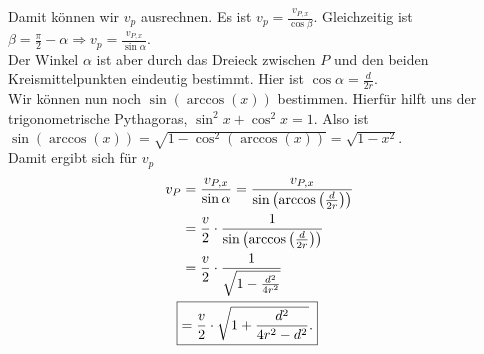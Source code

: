 \begin{Answer}[ref = circlemove]
	Damit können wir $v_p$ ausrechnen. Es ist $v_p = \frac{v_{P,x}}{\cos \beta}$. Gleichzeitig ist $\beta = \frac{\pi}{2}-\alpha \Rightarrow v_p = \frac{v_{P,x}}{\sin{\alpha}}$.\\
	Der Winkel $\alpha$ ist aber durch das Dreieck zwischen $P$ und den beiden Kreismittelpunkten eindeutig bestimmt. Hier ist $\cos \alpha = \frac{d}{2r}$.\\	Wir können nun noch  $\sin\left(\arccos\left(x\right)\right)$ bestimmen. Hierfür hilft uns der trigonometrische Pythagoras, $\sin^2x + \cos^2x = 1$. Also ist
		$\sin\left(\arccos\left(x\right)\right) = \sqrt{1-	\cos^2\left(\arccos\left(x\right)\right)} = \sqrt{1-x^2}$.\\
	Damit ergibt sich für $v_p$
	\begin{align*}
		v_P &= \frac{v_{P,x}}{\sin\alpha} = \frac{v_{P,x}}{\sin\left(\arccos\left(\frac{d}{2r}\right)\right)}\\
		&= \frac{v}{2}\cdot \frac{1}{\sin\left(\arccos\left(\frac{d}{2r}\right)\right)}\\
		&= \frac{v}{2} \cdot \frac{1}{\sqrt{1-\frac{d^2}{4r^2}}}\\
		\Aboxed{&= \frac{v}{2} \cdot \sqrt{1+\frac{d^2}{4r^2-d^2}}.}
	\end{align*}

	
	

\end{Answer}
